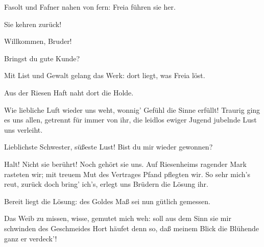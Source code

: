 \begin{drama}


\Logespeaks


Fasolt und Fafner nahen von fern:
Freia führen sie her.
 




\Frohspeaks
Sie kehren zurück!
 

\Donnerspeaks
Willkommen, Bruder!
 

\Frickaspeaks


Bringst du gute Kunde?
 

\Logespeaks


Mit List und Gewalt gelang das Werk:
dort liegt, was Freia löst.
 

\Donnerspeaks
Aus der Riesen Haft naht dort die Holde.
 

\Frohspeaks
Wie liebliche Luft wieder uns weht,
wonnig' Gefühl die Sinne erfüllt!
Traurig ging es uns allen,
getrennt für immer von ihr,
die leidlos ewiger Jugend
jubelnde Lust uns verleiht.
 




\Frickaspeaks
{}
Lieblichste Schwester, süßeste Lust!
Bist du mir wieder gewonnen?
 

\Fasoltspeaks


Halt! Nicht sie berührt!
Noch gehört sie uns.
Auf Riesenheims ragender Mark
rasteten wir; mit treuem Mut
des Vertrages Pfand pflegten wir.
So sehr mich's reut, zurück doch bring' ich's,
erlegt uns Brüdern die Lösung ihr.
 

\Wotanspeaks
Bereit liegt die Lösung:
des Goldes Maß sei nun gütlich gemessen.
 

\Fasoltspeaks
Das Weib zu missen, wisse, gemutet mich weh:
soll aus dem Sinn sie mir schwinden
des Geschmeides Hort häufet denn so,
daß meinem Blick die Blühende ganz er verdeck'!
 


\end{drama}
